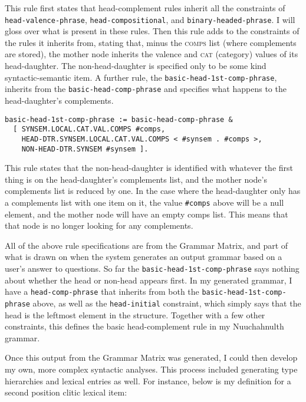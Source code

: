 \noindent This rule first states that head-complement rules inherit all the constraints of \texttt{head-valence-phrase}, \texttt{head-compositional}, and \texttt{binary-headed-phrase}. I will gloss over what is present in these rules. Then this rule adds to the constraints of the rules it inherits from, stating that, minus the \textsc{comps} list (where complements are stored), the mother node inherits the valence and \textsc{cat} (category) values of its head-daughter. The non-head-daughter is specified only to be some kind syntactic-semantic item. A further rule, the \texttt{basic-head-1st-comp-phrase}, inherits from the \texttt{basic-head-comp-phrase} and specifies what happens to the head-daughter's complements.

\begin{verbatim}
basic-head-1st-comp-phrase := basic-head-comp-phrase &
  [ SYNSEM.LOCAL.CAT.VAL.COMPS #comps,
    HEAD-DTR.SYNSEM.LOCAL.CAT.VAL.COMPS < #synsem . #comps >,
    NON-HEAD-DTR.SYNSEM #synsem ].
\end{verbatim}

\noindent This rule states that the non-head-daughter is identified with whatever the first thing is on the head-daughter's complements list, and the mother node's complements list is reduced by one. In the case where the head-daughter only has a complements list with one item on it, the value \texttt{\#comps} above will be a null element, and the mother node will have an empty comps list. This means that that node is no longer looking for any complements.

All of the above rule specifications are from the Grammar Matrix, and part of what is drawn on when the system generates an output grammar based on a user's answer to questions. So far the \texttt{basic-head-1st-comp-phrase} says nothing about whether the head or non-head appears first. In my generated grammar, I have a \texttt{head-comp-phrase} that inherits from both the \texttt{basic-head-1st-comp-phrase} above, as well as the \texttt{head-initial} constraint, which simply says that the head is the leftmost element in the structure. Together with a few other constraints, this defines the basic head-complement rule in my Nuuchahnulth grammar.

Once this output from the Grammar Matrix was generated, I could then develop my own, more complex syntactic analyses. This process included generating type hierarchies and lexical entries as well. For instance, below is my definition for a second position clitic lexical item:

